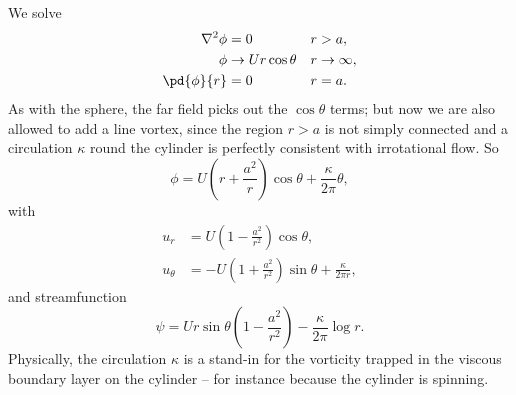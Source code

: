 \begin{example} \label{eg:cylinder}
	We solve
	\begin{align*}
		\nabla^2 \phi &= 0 & &r > a,\\
		\phi &\to Ur\cos\theta & &r \to \infty, \\
		\pd{\phi}{r} &= 0 & &r = a.
	\end{align*}
	As with the sphere, the far field picks out the $\cos\theta$ terms; but now we are also allowed to add a line vortex, since the region $r > a$ is not simply connected and a circulation $\kappa$ round the cylinder is perfectly consistent with irrotational flow. So
	$$
	\phi = U\left(r + \frac{a^2}{r}\right)\cos\theta + \frac{\kappa}{2\pi}\theta,
	$$
	with
	\begin{align*}
		u_r &= U\left(1 - \frac{a^2}{r^2}\right)\cos\theta, \\
		u_\theta &= -U\left(1 + \frac{a^2}{r^2}\right)\sin\theta + \frac{\kappa}{2\pi r},
	\end{align*}
	and streamfunction
	$$
	\psi = U r \sin\theta\left(1 - \frac{a^2}{r^2}\right) - \frac{\kappa}{2\pi}\log r.
	$$
	Physically, the circulation $\kappa$ is a stand-in for the vorticity trapped in the viscous boundary layer on the cylinder -- for instance because the cylinder is spinning.


\end{example}
